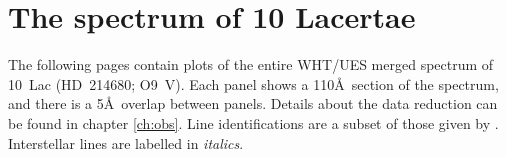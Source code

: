 \chapter{The spectrum of 10 Lacertae}
\label{app:10lac}

The following pages contain plots of the entire WHT/UES merged
spectrum of 10~Lac (HD~214680; O9~V). Each panel shows a 110\AA\ section
of the spectrum, and there is a 5\AA\ overlap between panels. Details
about the data reduction can be found in chapter \ref{ch:obs}. Line
identifications are a subset of those given by
. Interstellar lines are labelled in \textit{italics}.

\newpage

\epsfxsize=15cm


\newpage

\epsfxsize=15cm

\newpage

\epsfxsize=15cm

\newpage

\epsfxsize=15cm

\newpage

\epsfxsize=15cm

\newpage

\epsfxsize=15cm

\newpage

\epsfxsize=15cm

